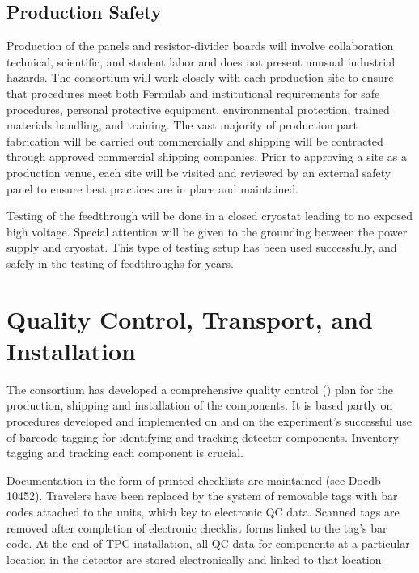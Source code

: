 \subsection{Production Safety}
\label{sec:fdsp-hv-prod-safety}

Production of the  panels and resistor-divider boards will involve collaboration technical, scientific, and student labor and  does not present unusual industrial hazards. The  consortium will work closely with each production site to ensure that procedures meet both Fermilab and institutional requirements for safe procedures, personal protective equipment, environmental protection, trained materials handling, and training. The vast majority of production part fabrication will be carried out commercially and shipping will be contracted through approved commercial shipping companies. Prior to approving a site as a production venue, each site will be visited and reviewed by an external safety panel to ensure best practices are in place and maintained. 

Testing of the  feedthrough will be done in a closed cryostat leading to no exposed high voltage.  Special attention will be given to the grounding between the power supply and cryostat.  This type of testing setup has been used successfully, and safely in the testing of  feedthroughs for years.

\clearpage
\section{Quality Control, Transport, and Installation}
\label{sec:fdsp-hv-transport}
The  consortium has developed a comprehensive quality control ()
plan for the production, shipping and installation of the   components. %
It is based partly on  procedures developed and implemented on  and on the \nova experiment's successful use of barcode tagging for identifying and tracking detector components.  Inventory tagging and tracking each component is crucial. %

Documentation in the form of printed checklists are maintained (see Docdb 10452). Travelers have been replaced by the system of removable tags with bar codes attached to the units, which key to electronic QC data.  Scanned tags are removed after completion of electronic checklist forms linked to the tag's bar code.  At the end of TPC installation, all QC data for components at a particular location in the detector are stored electronically and linked to that location.

